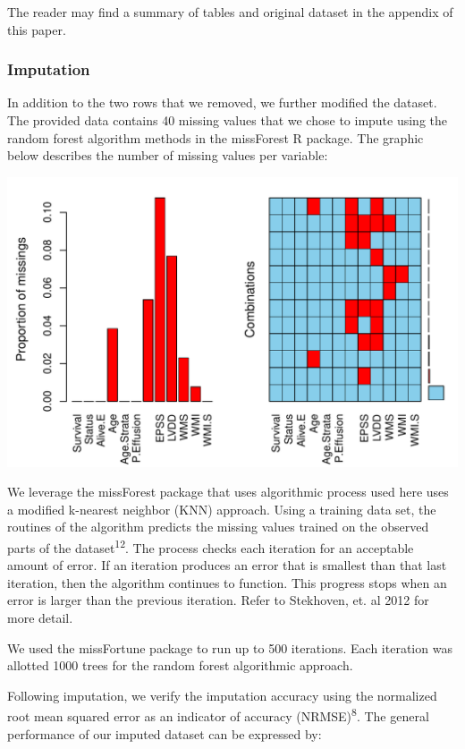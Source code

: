 \documentclass[
]{article}
\begin{document}
The reader may find a summary of tables and original dataset in the
appendix of this paper.

\hypertarget{imputation}{%
\subsubsection{Imputation}\label{imputation}}

In addition to the two rows that we removed, we further modified the
dataset. The provided data contains 40 missing values that we chose to
impute using the random forest algorithm methods in the missForest R
package. The graphic below describes the number of missing values per
variable:

\includegraphics{markdown_files/figure-latex/missing.table-1.pdf}

We leverage the missForest package that uses algorithmic process used
here uses a modified k-nearest neighbor (KNN) approach. Using a training
data set, the routines of the algorithm predicts the missing values
trained on the observed parts of the dataset\textsuperscript{12}. The
process checks each iteration for an acceptable amount of error. If an
iteration produces an error that is smallest than that last iteration,
then the algorithm continues to function. This progress stops when an
error is larger than the previous iteration. Refer to Stekhoven, et. al
2012 for more detail.

We used the missFortune package to run up to 500 iterations. Each
iteration was allotted 1000 trees for the random forest algorithmic
approach.

Following imputation, we verify the imputation accuracy using the
normalized root mean squared error as an indicator of accuracy
(NRMSE)\textsuperscript{8}. The general performance of our imputed
dataset can be expressed by:
\end{document}
